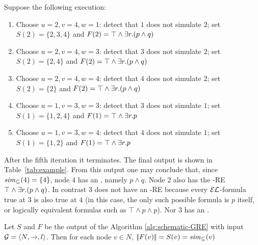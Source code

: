 \begin{ex}
Suppose the following execution:
\begin{enumerate}
\item Choose $u=2,v=4,w=1$: detect that $1$ does not simulate $2$; set $S(2)=\{2,3,4\}$ and $F(2)=\top\wedge\exists r.(p\wedge q)$
\item Choose $u=2,v=4,w=3$: detect that $3$ does not simulate $2$; set $S(2)=\{2,4\}$ and $F(2)=\top\wedge\exists r.(p\wedge q)$
\item Choose $u=2,v=4,w=4$: detect that $4$ does not simulate $2$; set $S(2)=\{2\}$ and $F(2)=\top\wedge\exists r.(p\wedge q)$
\item Choose $u=1,v=3,w=3$: detect that $3$ does not simulate $1$; set $S(1)=\{1,2,4\}$ and $F(1)=\top\wedge\exists r. p$
\item Choose $u=1,v=3,w=4$: detect that $4$ does not simulate $1$; set $S(1)=\{1,2\}$ and $F(1)=\top\wedge\exists r. p$
\end{enumerate}
After the fifth iteration it terminates. The final output is shown
in Table~\ref{tab:example}. From this output one may conclude that,
since ${\it sim}_\subseteq(4)=\{4\}$, node $4$ has an \posre, namely
$p\wedge q$. Node $2$ also has the \EL-RE $\top\wedge\exists r.(p\wedge
q)$. In contrast $3$ does not have an \EL-RE because every
$\mathcal{EL}$-formula true at $3$ is also true at $4$ (in this case, the
only such possible formula is $p$ itself, or logically equivalent
formulas such as $\top\wedge p\wedge p$). Nor $3$ has an \posre.
\end{ex}
\fi

\iffullversion
\begin{theorem}\label{thm:correctness-schematic-GRE}
Let $S$ and $F$ be the output of the Algorithm
\ref{alg:schematic-GRE} with input $\mathcal{G}=\langle N,\to,l\rangle$. Then for each
node $v\in N$, $|\!|F(v)|\!| = S(v) = {\it sim}_\subseteq(v)$
\end{theorem}
\fi

